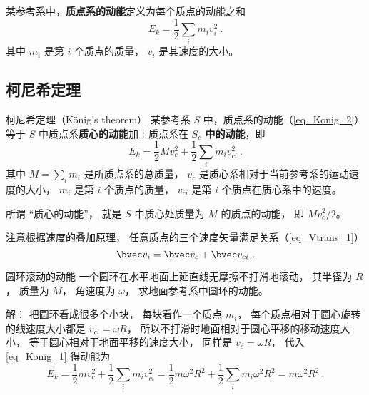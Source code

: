 

某参考系中，\textbf{质点系的动能}定义为每个质点的动能之和
\begin{equation}\label{eq_Konig_2}
E_k = \frac12 \sum_i m_i v_{i}^2 ~.
\end{equation}
其中 $m_i$ 是第 $i$ 个质点的质量， $v_i$ 是其速度的大小。

\subsection{柯尼希定理}

\begin{theorem}{柯尼希定理（König's theorem）}
某参考系 $S$ 中，质点系的动能（\autoref{eq_Konig_2}）等于 $S$ 中质点系\textbf{质心的动能}加上质点系在\textbf{ $S_c$ 中的动能}，即
\begin{equation}\label{eq_Konig_1}
E_k = \frac12 Mv_c^2 + \frac12 \sum_i m_i v_{ci}^2 ~.
\end{equation}
其中 $M=\sum_i m_i$ 是所质点系的总质量， $v_c$ 是质心系相对于当前参考系的运动速度的大小， $m_i$ 是第 $i$ 个质点的质量， $v_{ci}$ 是第 $i$ 个质点在质心系中的速度。

所谓 “质心的动能”， 就是 $S$ 中质心处质量为 $M$ 的质点的动能， 即 $Mv_c^2/2$。
\end{theorem}
注意根据速度的叠加原理， 任意质点的三个速度矢量满足关系（\autoref{eq_Vtrans_1}）
\begin{equation}\label{eq_Konig_3}
\bvec v_i = \bvec v_c + \bvec v_{ci}~.
\end{equation}

\begin{example}{圆环滚动的动能}
一个圆环在水平地面上延直线无摩擦不打滑地滚动， 其半径为 $R$， 质量为 $M$， 角速度为 $\omega$， 求地面参考系中圆环的动能。

解： 把圆环看成很多个小块， 每块看作一个质点 $m_i$， 每个质点相对于圆心旋转的线速度大小都是 $v_{ci} = \omega R$， 所以不打滑时地面相对于圆心平移的移动速度大小， 等于圆心相对于地面平移的速度大小， 同样是 $v_c = \omega R$， 代入\autoref{eq_Konig_1} 得动能为
\begin{equation}
E_k = \frac12 m v_c^2 + \frac12 \sum_i m_i v_{ci}^2 = \frac12 m\omega^2 R^2 + \frac12 \sum_i m_i \omega^2 R^2 = m\omega^2 R^2~.
\end{equation}
\end{example}


